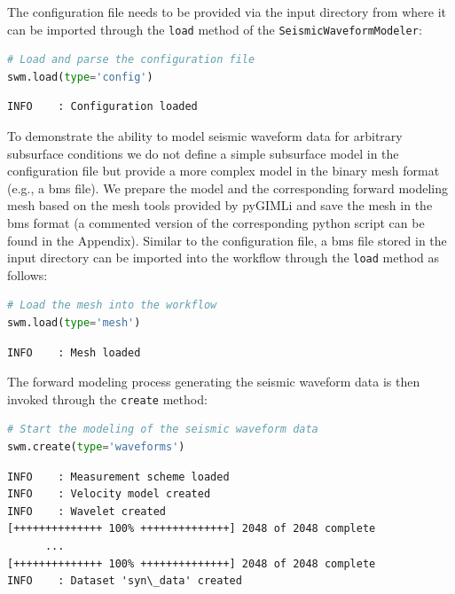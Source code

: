 \documentclass[a4paper,fleqn]{cas-sc}
\begin{document}
The configuration file needs to be provided via the input directory from where it can be imported through the \texttt{load} method of the \texttt{SeismicWaveformModeler}:
\begin{lstlisting}[language=Python, firstnumber=6]
# Load and parse the configuration file
swm.load(type='config')
\end{lstlisting}
\begin{footnotesize}
\begin{verbatim}
INFO    : Configuration loaded
\end{verbatim}
\end{footnotesize}
To demonstrate the ability to model seismic waveform data for arbitrary subsurface conditions we do not define a simple subsurface model in the configuration file but provide a more complex model in the binary mesh format (e.g., a bms file). We prepare the model and the corresponding forward modeling mesh based on the mesh tools provided by pyGIMLi and save the mesh in the bms format (a commented version of the corresponding python script can be found in the Appendix). Similar to the configuration file, a bms file stored in the input directory can be imported into the workflow through the \texttt{load} method as follows:
\begin{lstlisting}[language=Python, firstnumber=8]
# Load the mesh into the workflow
swm.load(type='mesh')
\end{lstlisting}
\begin{footnotesize}
\begin{verbatim}
INFO    : Mesh loaded
\end{verbatim}
\end{footnotesize}
The forward modeling process generating the seismic waveform data is then invoked through the \texttt{create} method:
\begin{lstlisting}[language=Python, firstnumber=10]
# Start the modeling of the seismic waveform data
swm.create(type='waveforms')
\end{lstlisting}
\begin{footnotesize}
\begin{verbatim}
INFO    : Measurement scheme loaded
INFO    : Velocity model created
INFO    : Wavelet created
[++++++++++++++ 100% ++++++++++++++] 2048 of 2048 complete
      ...
[++++++++++++++ 100% ++++++++++++++] 2048 of 2048 complete
INFO    : Dataset 'syn\_data' created
\end{verbatim}
\end{footnotesize}
\end{document}
